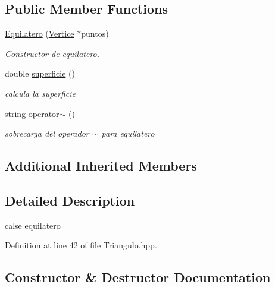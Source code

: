 \subsection*{Public Member Functions}
\begin{DoxyCompactItemize}
\item 
\hyperlink{class_equilatero_a27bc291f53fa7dfa9a4cc3617bca5ecf}{Equilatero} (\hyperlink{class_vertice}{Vertice} $\ast$puntos)
\begin{DoxyCompactList}\small\item\em Constructor de equilatero. \end{DoxyCompactList}\item 
\mbox{\label{class_equilatero_a16d707c455bde08915f06eeff3a98a99}} 
double \hyperlink{class_equilatero_a16d707c455bde08915f06eeff3a98a99}{superficie} ()
\begin{DoxyCompactList}\small\item\em calcula la superficie \end{DoxyCompactList}\item 
\mbox{\label{class_equilatero_a1e103b1d16b785da9a8b43b17739ad7a}} 
string \hyperlink{class_equilatero_a1e103b1d16b785da9a8b43b17739ad7a}{operator$\sim$} ()
\begin{DoxyCompactList}\small\item\em sobrecarga del operador $\sim$ para equilatero \end{DoxyCompactList}\end{DoxyCompactItemize}
\subsection*{Additional Inherited Members}


\subsection{Detailed Description}
calse equilatero 

Definition at line 42 of file Triangulo.\+hpp.



\subsection{Constructor \& Destructor Documentation}
\mbox{\label{class_equilatero_a27bc291f53fa7dfa9a4cc3617bca5ecf}} 
